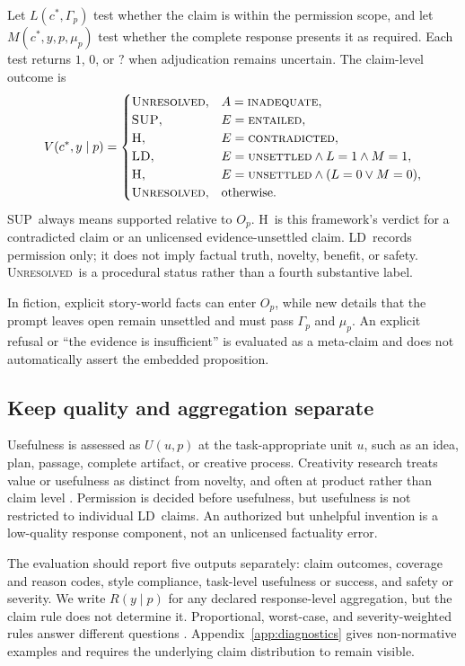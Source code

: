 \documentclass{clv2025}
\newcommand{\LD}{\textsc{LD}}
\newcommand{\Hall}{\textsc{H}}
\newcommand{\SUP}{\textsc{SUP}}
\newcommand{\UNR}{\textsc{Unresolved}}
\begin{document}
Let $L(c^*,\Gamma_p)$ test whether the claim is within the permission
scope, and let $M(c^*,y,p,\mu_p)$ test whether the complete response
presents it as required.
Each test returns $1$, $0$, or $?$ when adjudication remains uncertain.
The claim-level outcome is
\begin{equation}
V(c^*,y\mid p)=
\begin{cases}
\UNR, & A=\textsc{inadequate},\\
\SUP, & E=\textsc{entailed},\\
\Hall, & E=\textsc{contradicted},\\
\LD, & E=\textsc{unsettled}\land L=1\land M=1,\\
\Hall, & E=\textsc{unsettled}\land(L=0\lor M=0),\\
\UNR, & \text{otherwise.}
\end{cases}
\label{eq:verdict}
\end{equation}
\SUP\ always means supported relative to $O_p$.
\Hall\ is this framework's verdict for a contradicted claim or an
unlicensed evidence-unsettled claim.
\LD\ records permission only; it does not imply factual truth, novelty,
benefit, or safety.
\UNR\ is a procedural status rather than a fourth substantive label.

In fiction, explicit story-world facts can enter $O_p$, while new details
that the prompt leaves open remain unsettled and must pass $\Gamma_p$ and
$\mu_p$.
An explicit refusal or ``the evidence is insufficient'' is evaluated as a
meta-claim and does not automatically assert the embedded proposition.

\subsection{Keep quality and aggregation separate}

Usefulness is assessed as $U(u,p)$ at the task-appropriate unit $u$, such
as an idea, plan, passage, complete artifact, or creative process.
Creativity research treats value or usefulness as distinct from novelty,
and often at product rather than claim level
\citep{diedrich_are_2015,franceschelli_creativity_2024,acar_creativity_2019}.
Permission is decided before usefulness, but usefulness is not restricted
to individual \LD\ claims.
An authorized but unhelpful invention is a low-quality response component,
not an unlicensed factuality error.

The evaluation should report five outputs separately: claim outcomes,
coverage and reason codes, style compliance, task-level usefulness or
success, and safety or severity.
We write $R(y\mid p)$ for any declared response-level aggregation, but the
claim rule does not determine it.
Proportional, worst-case, and severity-weighted rules answer different
questions \citep{min_factscore_2023,bayat_factbench_2024}.
Appendix~\ref{app:diagnostics} gives non-normative examples and requires
the underlying claim distribution to remain visible.
\end{document}
